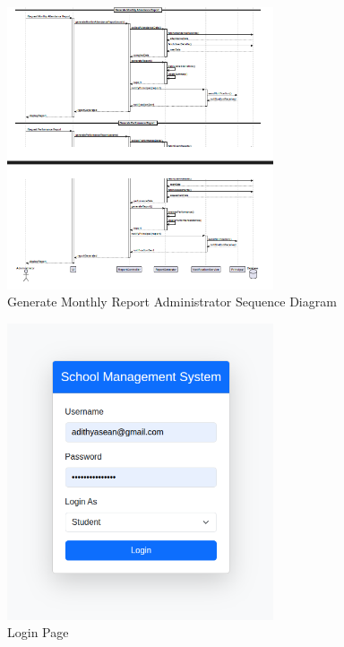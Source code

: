 \documentclass[12pt,a4paper]{report}
\begin{document}
\begin{figure}[htbp]
    \centering
    \includegraphics[width=0.7\textwidth]{generate-monthly-report-dministrator-sequence.png}
    \caption{Generate Monthly Report Administrator Sequence Diagram}
    \label{fig:generate-monthly-report-dministrator-sequence}
\end{figure}

\begin{figure}[htbp]
    \centering
    \includegraphics[width=0.7\textwidth]{login-page.png}
    \caption{Login Page}
    \label{fig:login-page}
\end{figure}
\end{document}
